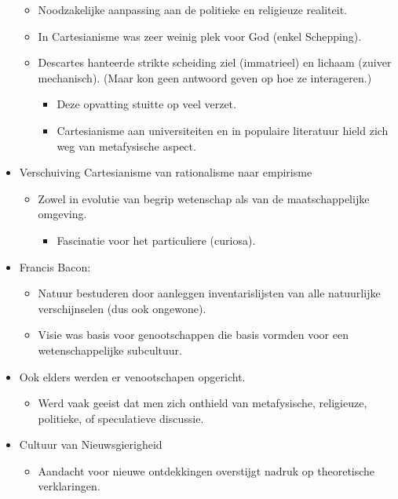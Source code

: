 \documentclass{article}
\begin{document}
\begin{itemize}
\begin{itemize}
        \item Noodzakelijke aanpassing aan de politieke en religieuze realiteit.
        \item In Cartesianisme was zeer weinig plek voor God (enkel Schepping).
        \item Descartes hanteerde strikte scheiding ziel (immatrieel) en lichaam (zuiver mechanisch). (Maar kon geen antwoord geven op hoe ze interageren.)
        \begin{itemize}
          \item Deze opvatting stuitte op veel verzet.
          \item Cartesianisme aan universiteiten en in populaire literatuur hield zich weg van metafysische aspect.
        \end{itemize}
      \end{itemize}
      \item Verschuiving Cartesianisme van rationalisme naar empirisme
      \begin{itemize}
        \item Zowel in evolutie van begrip wetenschap als van de maatschappelijke omgeving.
        \begin{itemize}
          \item Fascinatie voor het particuliere (curiosa).
        \end{itemize}
      \end{itemize}
      \item Francis Bacon:
      \begin{itemize}
        \item Natuur bestuderen door aanleggen inventarislijsten van alle natuurlijke verschijnselen (dus ook ongewone).
        \item Visie was basis voor genootschappen die basis vormden voor een wetenschappelijke subcultuur.
      \end{itemize}
      \item Ook elders werden er venootschapen opgericht.
      \begin{itemize}
        \item Werd vaak geeist dat men zich onthield van metafysische, religieuze, politieke, of speculatieve discussie.
      \end{itemize}
      \item Cultuur van Nieuwsgierigheid
      \begin{itemize}
        \item Aandacht voor nieuwe ontdekkingen overstijgt nadruk op theoretische verklaringen.

\end{itemize}
\end{itemize}
\end{document}
